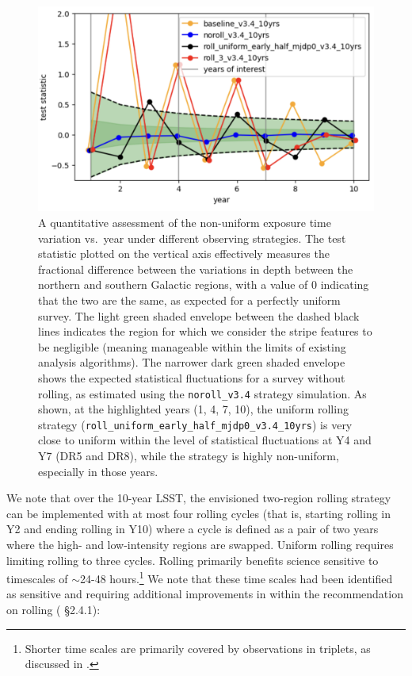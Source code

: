 \begin{figure}
  \centering
    \includegraphics[width=0.75\linewidth]{figures/stripiness_metric.png}
    \caption{
    A quantitative assessment of the non-uniform exposure time variation vs.\ year under different observing strategies.  The test statistic plotted on the vertical axis effectively measures the fractional difference between the variations in depth between the northern and southern Galactic regions, with a value of 0 indicating that the two are the same, as expected for a perfectly uniform survey.  The light green shaded envelope between the dashed black lines indicates the region for which we consider the stripe features to be negligible (meaning manageable within the limits of existing analysis algorithms).   The narrower dark green shaded envelope shows the expected statistical fluctuations for a survey without rolling, as estimated using the \texttt{noroll\_v3.4} strategy simulation.  As shown, at the highlighted years (1, 4, 7, 10), the uniform rolling strategy (\texttt{roll\_uniform\_early\_half\_mjdp0\_v3.4\_10yrs}) is very close to uniform within the level of statistical fluctuations at Y4 and Y7 (DR5 and DR8), while the  strategy is highly non-uniform, especially in those years.
}
    \label{fig:stripiness}
\end{figure}

We note that over the 10-year LSST, the envisioned two-region rolling strategy can be implemented with at most four rolling cycles (that is, starting rolling in Y2 and ending rolling in Y10) where a cycle is defined as a pair of two years where the high- and low-intensity regions are swapped. Uniform rolling requires limiting rolling to three cycles. Rolling primarily benefits science sensitive to timescales of \mbox{$\sim$24-48} hours.\footnote{Shorter time scales are primarily covered by observations in triplets, as discussed in .} 
We note that these time scales had been identified as sensitive and requiring additional improvements in  within the recommendation on rolling ( \S2.4.1): 

